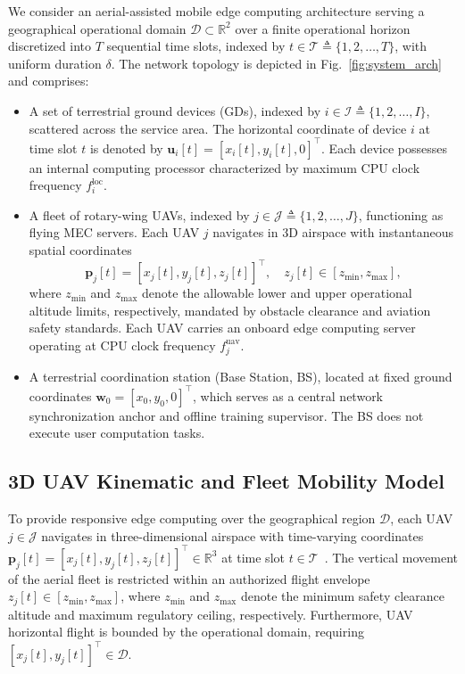 \documentclass[journal]{IEEEtran}
\begin{document}
We consider an aerial-assisted mobile edge computing architecture serving a geographical operational domain $\mathcal{D} \subset \mathbb{R}^2$ over a finite operational horizon discretized into $T$ sequential time slots, indexed by $t \in \mathcal{T} \triangleq \{1, 2, \dots, T\}$, with uniform duration $\delta$. The network topology is depicted in Fig.~\ref{fig:system_arch} and comprises:
\begin{itemize}
    \item A set of terrestrial ground devices (GDs), indexed by $i \in \mathcal{I} \triangleq \{1, 2, \dots, I\}$, scattered across the service area. The horizontal coordinate of device $i$ at time slot $t$ is denoted by $\mathbf{u}_i[t] = [x_i[t], y_i[t], 0]^\top$. Each device possesses an internal computing processor characterized by maximum CPU clock frequency $f_i^{\mathrm{loc}}$.
    \item A fleet of rotary-wing UAVs, indexed by $j \in \mathcal{J} \triangleq \{1, 2, \dots, J\}$, functioning as flying MEC servers. Each UAV $j$ navigates in 3D airspace with instantaneous spatial coordinates
    \begin{equation}
    \mathbf{p}_j[t] = [x_j[t], y_j[t], z_j[t]]^\top, \quad z_j[t] \in [z_{\min}, z_{\max}],
    \end{equation}
    where $z_{\min}$ and $z_{\max}$ denote the allowable lower and upper operational altitude limits, respectively, mandated by obstacle clearance and aviation safety standards. Each UAV carries an onboard edge computing server operating at CPU clock frequency $f_j^{\mathrm{uav}}$.
    \item A terrestrial coordination station (Base Station, BS), located at fixed ground coordinates $\mathbf{w}_0 = [x_0, y_0, 0]^\top$, which serves as a central network synchronization anchor and offline training supervisor. The BS does not execute user computation tasks.
\end{itemize}

\subsection{3D UAV Kinematic and Fleet Mobility Model}

To provide responsive edge computing over the geographical region $\mathcal{D}$, each UAV $j \in \mathcal{J}$ navigates in three-dimensional airspace with time-varying coordinates $\mathbf{p}_j[t] = [x_j[t], y_j[t], z_j[t]]^\top \in \mathbb{R}^3$ at time slot $t \in \mathcal{T}$~\cite{li2026tnse}. The vertical movement of the aerial fleet is restricted within an authorized flight envelope $z_j[t] \in [z_{\min}, z_{\max}]$, where $z_{\min}$ and $z_{\max}$ denote the minimum safety clearance altitude and maximum regulatory ceiling, respectively. Furthermore, UAV horizontal flight is bounded by the operational domain, requiring $[x_j[t], y_j[t]]^\top \in \mathcal{D}$.
\end{document}
